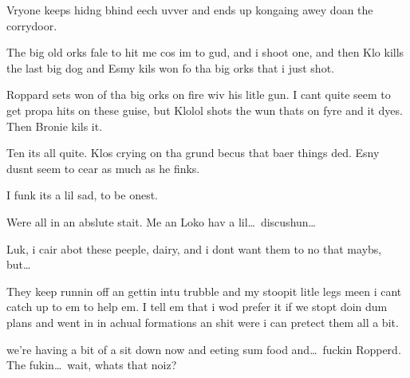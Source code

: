 Vryone keeps hidng bhind eech uvver and ends up kongaing awey doan the corrydoor.\medskip

The big old orks fale to hit me cos im to gud, and i shoot one, and then Klo kills the last big dog and Esmy kils won fo tha big orks that i just shot.\medskip

Roppard sets won of tha big orks on fire wiv his litle gun. I cant quite seem to get propa hits on these guise, but Klolol shots the wun thats on fyre and it dyes. Then Bronie kils it.\medskip

Ten its all quite. Klos crying on tha grund becus that baer things ded. Esny dusnt seem to cear as much as he finks.\medskip

I funk its a lil sad, to be onest.\medskip

Were all in an abslute stait. Me an Loko hav a lil\ldots\ discushun\ldots\medskip

Luk, i cair abot these peeple, dairy, and i dont want them to no that maybs, but\ldots\medskip

They keep runnin off an gettin intu trubble and my stoopit litle legs meen i cant catch up to em to help em. I tell em that i wod prefer it if we stopt doin dum plans and went in in achual formations an shit were i can pretect them all a bit.\medskip

we're having a bit of a sit down now and eeting sum food and\ldots\ fuckin Ropperd. The fukin\ldots\ wait, whats that noiz?

\vspace*{5mm}
